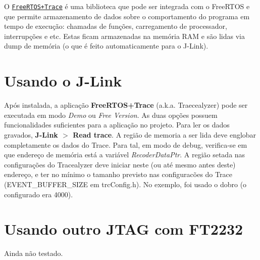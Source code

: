 O \href{http://www.freertos.org/FreeRTOS-Plus/FreeRTOS_Plus_Trace/FreeRTOS_Plus_Trace.shtml}{\tt Free\+R\+T\+O\+S+\+Trace} é uma biblioteca que pode ser integrada com o Free\+R\+T\+OS e que permite armazenamento de dados sobre o comportamento do programa em tempo de execução\+: chamadas de funções, carregamento de processador, interrupções e etc. Estas ficam armazenadas na memória R\+AM e são lidas via dump de memória (o que é feito automaticamente para o J-\/\+Link).\hypertarget{page_freertosplustrace_page_freertosplustrace_section_jlink}{}\section{Usando o J-\/\+Link}\label{page_freertosplustrace_page_freertosplustrace_section_jlink}
Após instalada, a aplicação {\bfseries Free\+R\+T\+O\+S+\+Trace} (a.\+k.\+a. Traecealyzer) pode ser executada em modo {\itshape Demo} ou {\itshape Free Version}. As duas opções possuem funcionalidades suficientes para a aplicação no projeto. Para ler os dados gravados, {\bfseries J-\/\+Link $>$ Read trace}. A região de memoria a ser lida deve englobar completamente os dados do Trace. Para tal, em modo de debug, verifica-\/se em que endereço de memória está a variável {\itshape Recoder\+Data\+Ptr}. A região setada nas configurações do Tracealyzer deve iniciar neste (ou até mesmo antes deste) endereço, e ter no mínimo o tamanho previsto nas configuracões do Trace (E\+V\+E\+N\+T\+\_\+\+B\+U\+F\+F\+E\+R\+\_\+\+S\+I\+ZE em trc\+Config.\+h). No exemplo, foi usado o dobro (o configurado era 4000).



\hypertarget{page_freertosplustrace_page_freertosplustrace_section_ft2232}{}\section{Usando outro J\+T\+A\+G com F\+T2232}\label{page_freertosplustrace_page_freertosplustrace_section_ft2232}
Ainda não testado. 